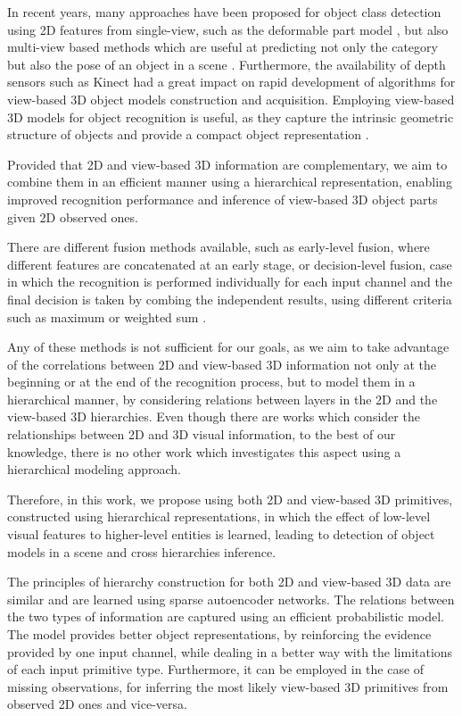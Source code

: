\documentclass[runningheads]{llncs}
\begin{document}
In recent years, many approaches have been proposed for object class detection using 2D features from single-view, such as the deformable part model \cite{Felzenswalb2010}, but also multi-view based methods which are useful at predicting not only the category but also the pose of an object in a scene \cite{Teney2014}. Furthermore, the availability of depth sensors such as Kinect had a great impact on rapid development of algorithms for view-based 3D object models construction and acquisition. Employing view-based 3D models for object recognition is useful, as they capture the intrinsic geometric structure of objects and provide a compact object representation \cite{Liebelt2010}. 

Provided that 2D and view-based 3D information are complementary, we aim to combine them in an efficient manner using a hierarchical representation, enabling improved recognition performance and inference of view-based 3D object parts given 2D observed ones. 

There are different fusion methods available, such as early-level fusion, where different features are concatenated at an early stage, or decision-level fusion, case in which the recognition is performed individually for each input channel and the final decision is taken by combing the independent results, using different criteria such as maximum or weighted sum \cite{Mahmoudi2013}.

Any of these methods is not sufficient for our goals, as we aim to take advantage of the correlations between 2D and view-based 3D information not only at the beginning or at the end of the recognition process, but to model them in a hierarchical manner, by considering relations between layers in the 2D and the view-based 3D hierarchies. Even though there are works which consider the relationships between 2D and 3D visual information, to the best of our knowledge, there is no other work which investigates this aspect using a hierarchical modeling approach.

Therefore, in this work, we propose using both 2D and view-based 3D primitives, constructed using hierarchical representations, in which the effect of low-level visual features to higher-level entities is learned, leading to detection of object models in a scene and cross hierarchies inference. 

The principles of hierarchy construction for both 2D and view-based 3D data are similar and are learned using sparse autoencoder networks. The relations between the two types of information are captured using an efficient probabilistic model. The model provides better object representations, by reinforcing the evidence provided by one input channel, while dealing in a better way with the limitations of each input primitive type. Furthermore, it can be employed in the case of missing observations, for inferring the most likely view-based 3D primitives from observed 2D ones and vice-versa. 
\end{document}
